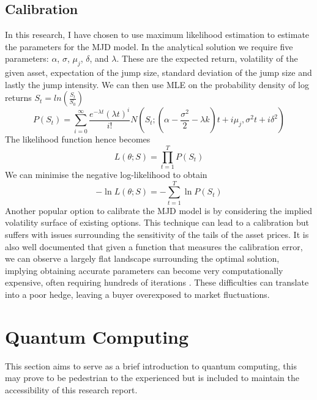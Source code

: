\documentclass[12pt]{article}
\numberwithin{equation}{section}
\begin{document}
\subsection{Calibration}
In this research, I have chosen to use maximum likelihood estimation to estimate 
the parameters for the MJD model. In the analytical solution we require five 
parameters: $\alpha$, $\sigma$, $\mu_j$, $\delta$, and $\lambda$. These are the 
expected return, volatility of the given asset, expectation of the jump size, 
standard deviation of the jump size and lastly the jump intensity. We can then 
use MLE on the probability density of log returns $S_t = ln(\frac{S_t}{S_0})$ 
\begin{equation}
P(S_t) = \sum^\infty_{i=0} \frac{e^{-\lambda t}(\lambda t)^i}{i!}N(S_t;(\alpha - 
\frac{\sigma^2}{2}-\lambda k)t+i\mu_j,\sigma^2t+i\delta^2)
\end{equation}
The likelihood function hence becomes 
\begin{equation}
  L(\theta;S) = \prod^T_{t=1}P(S_t)
\end{equation}
We can minimise the negative log-likelihood to obtain 
\begin{equation}
  -\ln L(\theta;S) = -\sum^T_{t=1}\ln P(S_t)
\end{equation}
Another popular option to calibrate the MJD model is by considering the implied 
volatility surface of existing options. This technique can lead to a 
calibration but suffers with issues surrounding the sensitivity of the tails of 
the asset prices. It is also well documented that given a function that measures 
the calibration error, we can observe a largely flat landscape surrounding the 
optimal solution, 
implying obtaining accurate parameters can become very computationally 
expensive, often requiring hundreds of iterations \autocite{jump05}. These difficulties
can translate into a poor hedge, leaving a buyer overexposed to market fluctuations. 

\clearpage


\section{Quantum Computing}
This section aims to serve as a brief introduction to quantum computing, this may prove 
to be pedestrian to the experienced but is included to maintain the accessibility 
of this research report.
\end{document}
